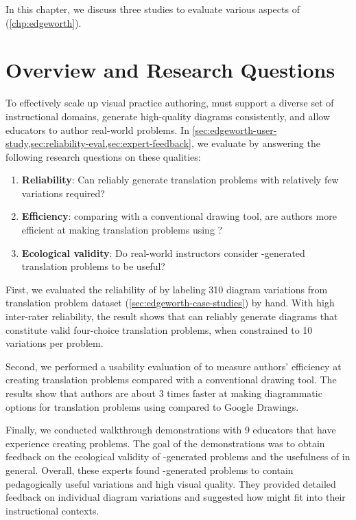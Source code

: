 In this chapter, we discuss three studies to evaluate various aspects of \Edgeworth (\cref{chp:edgeworth}).

\section{Overview and Research Questions}

To effectively scale up visual practice authoring, \Edgeworth must support a diverse set of instructional domains, generate high-quality diagrams consistently, and allow educators to author real-world problems. In \cref{sec:edgeworth-user-study,sec:reliability-eval,sec:expert-feedback}, we evaluate \Edgeworth by answering the following research questions on these qualities:

\begin{enumerate}[label=RQ\arabic*]
    \item\label{rq:mut} \textbf{Reliability}: Can \Edgeworth reliably generate translation problems with relatively few variations required?
    \item\label{rq:eff} \textbf{Efficiency}: comparing with a conventional drawing tool, are authors more efficient at making translation problems using \Edgeworth? 
    \item\label{rq:eco} \textbf{Ecological validity}: Do real-world instructors consider \Edgeworth-generated translation problems to be useful? 
\end{enumerate}

First, we evaluated the reliability of \Edgeworth by labeling 310 diagram variations from translation problem dataset (\cref{sec:edgeworth-case-studies}) by hand. With high inter-rater reliability, the result shows that \Edgeworth can reliably generate diagrams that constitute valid four-choice translation problems, when constrained to 10 variations per problem.

Second, we performed a usability evaluation of \Edgeworth to measure authors' efficiency at creating translation problems compared with a conventional drawing tool. The results show that authors are about 3 times faster at making diagrammatic options for translation problems using \Edgeworth compared to Google Drawings. 

Finally, we conducted walkthrough demonstrations with 9 educators that have experience creating problems. The goal of the demonstrations was to obtain feedback on the ecological validity of \Edgeworth-generated problems and the usefulness of \Edgeworth in general. Overall, these experts found \Edgeworth-generated problems to contain pedagogically useful variations and high visual quality. They provided detailed feedback on individual diagram variations and suggested how \Edgeworth might fit into their instructional contexts. 

